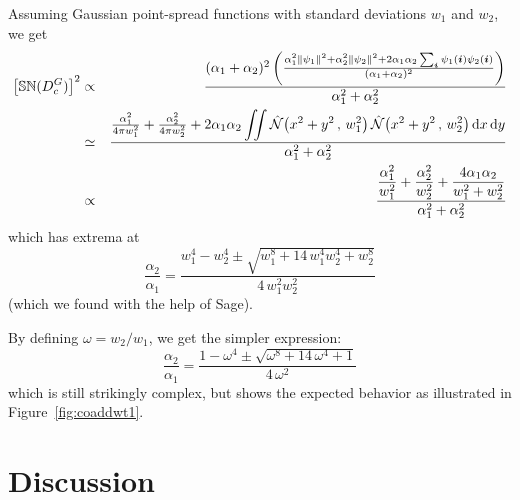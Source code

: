 \documentclass[letterpaper,preprint]{aastex}
\newcommand{\fig}{Figure}
\newcommand{\figref}[1]{\mbox{\fig~\ref{#1}}}
\newcommand{\gaussianN}{\mathcal{N}}
\newcommand{\gaussx}[1]{\hat{\gaussianN}\!\left(#1\right)}
\newcommand{\psf}{\psi}
\newcommand{\snr}[1]{\mathbb{SN}(#1)}
\newcommand{\norm}[1]{\left\lVert #1 \right\rVert}
\renewcommand{\vec}[1]{\boldsymbol{#1}}
\newcommand{\ivec}{\vec{i}}
\begin{document}
Assuming Gaussian point-spread functions with standard deviations
$w_1$ and $w_2$, we get
\begin{eqnarray}
%
\left[ \snr{D_c^G} \right]^2 &\propto&
\frac{(\alpha_1 + \alpha_2)^2 \left(
  \frac{\alpha_1^2 \norm{\psf_1}^2 + \alpha_2^2 \norm{\psf_2}^2 + 2 \alpha_1 \alpha_2 \sum_{\ivec} \psf_1(\ivec) \psf_2(\ivec)}%
       {(\alpha_1 + \alpha_2)^2}
\right)}
{\alpha_1^2 + \alpha_2^2} \\
%
&\simeq&
\frac{%
  \frac{\alpha_1^2}{4 \pi w_1^2}  +
  \frac{\alpha_2^2}{4 \pi w_2^2}  +
  2 \alpha_1 \alpha_2 \displaystyle\iint
  \gaussx{x^2 + y^2 \,,\, w_1^2} \gaussx{x^2 + y^2 \,,\, w_2^2}
  \mathrm{d}x \, \mathrm{d}y}%
     {\alpha_1^2 + \alpha_2^2} \\
&\propto&
\frac{%
  \displaystyle\frac{\alpha_1^2}{w_1^2}  +
  \displaystyle\frac{\alpha_2^2}{w_2^2}  +
  \displaystyle\frac{4 \alpha_1 \alpha_2}{w_1^2 + w_2^2}%
}{\alpha_1^2 + \alpha_2^2}
%
\end{eqnarray}
which has extrema at
\begin{equation}
\frac{\alpha_2}{\alpha_1} = \frac{w_1^4 - w_2^4 \pm \sqrt{w_1^8 + 14 \, w_1^4 w_2^4 + w_2^8}}{4 \, w_1^2 w_2^2}
\end{equation}
(which we found with the help of Sage). %


By defining $\omega = w_2 / w_1$, we get the simpler expression:
\begin{equation}
  \frac{\alpha_2}{\alpha_1} = \frac{1 - \omega^4 \pm \sqrt{\omega^8 + 14 \, \omega^4 + 1}}{4 \, \omega^2}
  \label{eq:coaddwt1}
\end{equation}
which is still strikingly complex, but shows the expected behavior as
illustrated in \figref{fig:coaddwt1}.


\section{Discussion}
\end{document}
